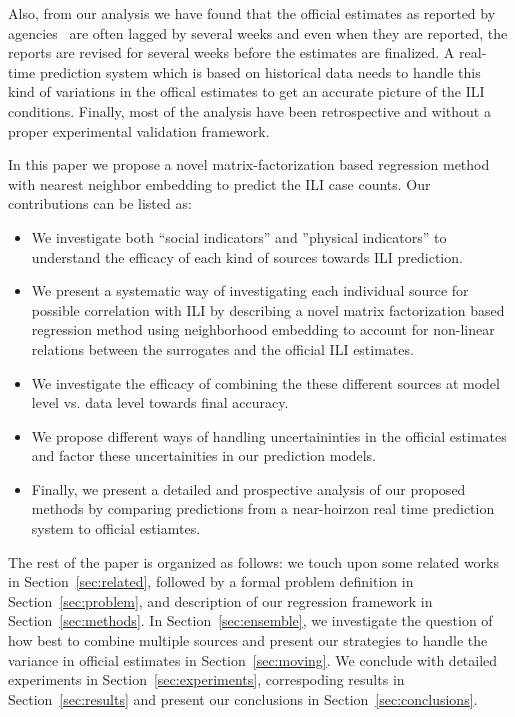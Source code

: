 Also, from our analysis we have found that the official estimates as reported by
agencies~\cite{PAHO:2013} are often lagged by several weeks and even when they
are reported, the reports are revised for several weeks before the estimates 
are finalized. A real-time prediction system which is based on historical data
needs to handle this kind of variations in the offical estimates to get an 
accurate picture of the ILI conditions. Finally, most of the analysis have been 
retrospective and without a proper experimental validation framework.

In this paper we propose a novel matrix-factorization based regression method with 
nearest neighbor embedding to predict the ILI case counts. Our contributions can be listed
as:
\begin{itemize}
  \item We investigate both ``social indicators'' and ''physical indicators'' to 
    understand the efficacy of each kind of sources towards ILI prediction.
  \item We present a systematic way of investigating each individual source for possible 
    correlation with ILI by describing a novel matrix factorization based regression method
    using neighborhood embedding to account for 
    non-linear relations between the surrogates and the official ILI estimates.
  \item We investigate the efficacy of combining the these different sources at model 
    level vs. data level towards final accuracy.
  \item We propose different ways of handling uncertaininties in the official 
    estimates and factor these uncertainities in our prediction models.
  \item Finally, we present a detailed and prospective analysis of our proposed methods
    by comparing predictions from a near-hoirzon real time prediction system to 
    official estiamtes.
\end{itemize}

The rest of the paper is organized as follows: we touch upon some related works in 
Section~\ref{sec:related}, followed by a formal problem definition in Section~\ref{sec:problem},
and description of our regression framework in Section~\ref{sec:methods}. In Section~\ref{sec:ensemble}, 
we investigate the question of how best to combine multiple sources and present our strategies to 
handle the variance in official estimates in Section~\ref{sec:moving}. We conclude with detailed 
experiments in Section~\ref{sec:experiments}, correspoding results in Section~\ref{sec:results} and present
our conclusions in Section~\ref{sec:conclusions}.

